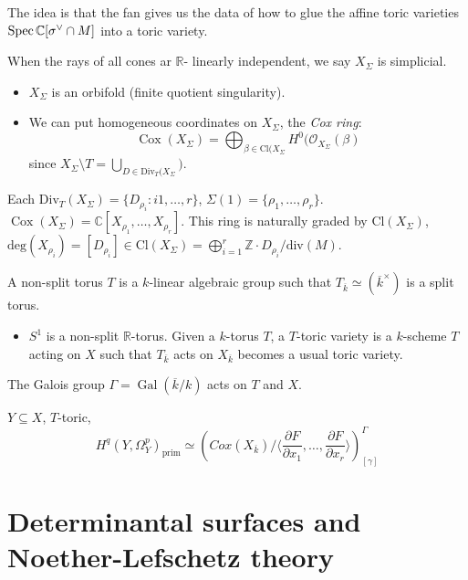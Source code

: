 The idea is that the fan gives us the data
of how to glue the affine toric varieties
$\mathop{\mathrm{Spec}} \mathbb{C}[\sigma^\vee \cap M]$
into a toric variety.

When the rays of all cones ar $\mathbb{R}$-
linearly independent, we say
$X_{\Sigma}$ is simplicial.
\begin{itemize}
\item $X_\Sigma$ is an orbifold
(finite quotient singularity).
\item We can put homogeneous coordinates
on $X_{\Sigma}$, the {\it Cox ring}:
$$
\operatorname{Cox}(X_{\Sigma})
= \bigoplus_{\beta \in \text{Cl}(X_{\Sigma}}
H^0(\mathcal{O}_{X_{\Sigma}}(\beta)
$$
since $X_{\Sigma}\setminus T
= \bigcup_{D \in
\text{Div}_{T}(X_{\Sigma}})$.
\end{itemize}

\noindent
Each $\text{Div}_T(X_{\Sigma})
=\{D_{\rho_i}:i 1,…,r\}$,
$\Sigma(1)= \{\rho_1,…,\rho_r\}$.
$\operatorname{Cox}(X_{\Sigma})
=\mathbb{C}[X_{\rho_1},…,X_{\rho_r}]$.
This ring is naturally graded by
$\text{Cl}(X_{\Sigma})$,
$\text{deg}(X_{\rho_i})=
[D_{\rho_i}] \in \text{Cl}(X_{\Sigma})
=\bigoplus_{i=1}^r \mathbb{Z}\cdot
D_{\rho_i}/\text{div}(M)$.

A non-split torus $T$ is a $k$-linear
algebraic group such that
$T_{\overline{k}}\simeq
(\overline{k}^\times)$ is a split torus.

\begin{itemize}
\item $S^1$ is a non-split
$\mathbb{R}$-torus.
Given a $k$-torus $T$, a $T$-toric
variety is a $k$-scheme $T$ acting on $X$
such that $T_{\overline{k}}$ acts on
$X_{\overline{k}}$ becomes a usual
toric variety.
\end{itemize}

\noindent
The Galois group $\Gamma=\operatorname{Gal}
(\overline{k}/k)$ acts on $T$ and $X$.

\begin{theorem}
\label{theorem-toric-primitive-hodge}
$Y \subseteq X$, $T$-toric,
$$
H^q(Y,\Omega_Y^p)_{\operatorname{prim}}
\simeq
(Cox(X_{\overline{k}})
/\langle \frac{\partial F}{\partial x_1}
,…,\frac{\partial F}{\partial x_r}\rangle)
^\Gamma_{[\gamma]}
$$
\end{theorem}

\section{Determinantal surfaces
and Noether-Lefschetz theory}
\label{section-determinantal-surfaces-nl}

